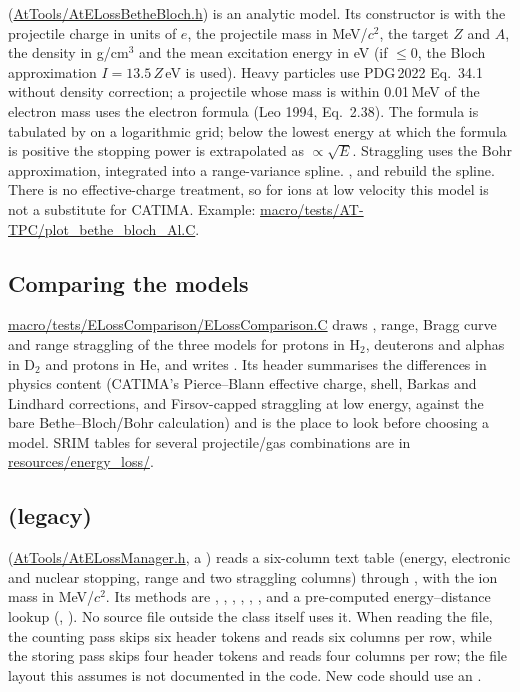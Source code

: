  (\url{AtTools/AtELossBetheBloch.h}) is an analytic model. Its constructor is
 with the projectile charge in units
of $e$, the projectile mass in MeV/$c^2$, the target $Z$ and $A$, the density in g/cm$^3$ and the mean excitation
energy in eV (if $\le 0$, the Bloch approximation $I = 13.5\,Z$\,eV is used). Heavy particles use PDG\,2022
Eq.~34.1 without density correction; a projectile whose mass is within 0.01\,MeV of the electron mass uses the
electron formula (Leo 1994, Eq.~2.38). The formula is tabulated by  on a logarithmic grid; below the lowest energy at which the formula is positive the stopping power is
extrapolated as $\propto\sqrt{E}$. Straggling uses the Bohr approximation, integrated into a range-variance spline.
,  and  rebuild the spline. There is no effective-charge treatment, so
for ions at low velocity this model is not a substitute for CATIMA. Example:
\url{macro/tests/AT-TPC/plot_bethe_bloch_Al.C}.

\subsection{Comparing the models}

\url{macro/tests/ELossComparison/ELossComparison.C} draws \dedx{}, range, Bragg curve and range straggling of the
three models for protons in H$_2$, deuterons and alphas in D$_2$ and protons in He, and writes
. Its header summarises the differences in physics content (CATIMA's Pierce--Blann
effective charge, shell, Barkas and Lindhard corrections, and Firsov-capped straggling at low energy, against the bare
Bethe--Bloch/Bohr calculation) and is the place to look before choosing a model. SRIM tables for several
projectile/gas combinations are in \url{resources/energy_loss/}.

\subsection{ (legacy)}

 (\url{AtTools/AtELossManager.h}, a ) reads a six-column text table
(energy, electronic and nuclear stopping, range and two straggling columns) through
, with the ion mass in MeV/$c^2$. Its methods are
, , ,
, ,
, and a pre-computed energy--distance lookup (,
). No source file outside the class itself uses it. When reading the file, the counting pass
skips six header tokens and reads six columns per row, while the storing pass skips four header tokens and reads four
columns per row; the file layout this assumes is not documented in the code. New code should use an
.

